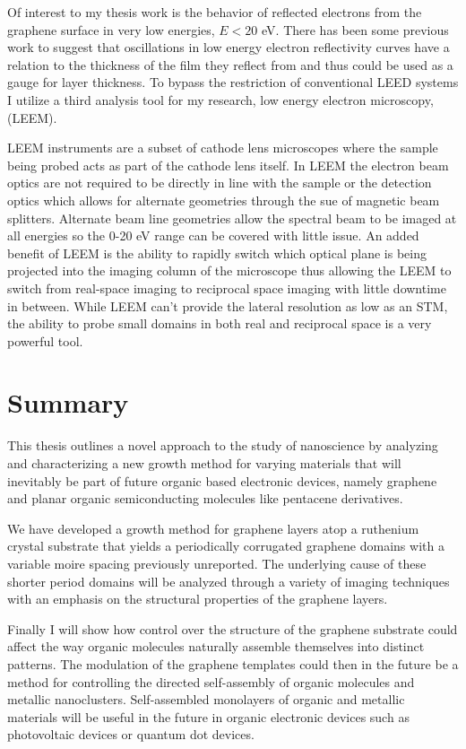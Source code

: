 Of interest to my thesis work is the behavior of reflected electrons from the graphene surface in very low energies, $E < 20$ eV. There has been some previous work to suggest that oscillations in low energy electron reflectivity curves have a relation to the thickness of the film they reflect from and thus could be used as a gauge for layer thickness. To bypass the restriction of conventional LEED systems I utilize a third analysis tool for my research, low energy electron microscopy, (LEEM).

LEEM instruments are a subset of cathode lens microscopes where the sample being probed acts as part of the cathode lens itself. In LEEM the electron beam optics are not required to be directly in line with the sample or the detection optics which allows for alternate geometries through the sue of magnetic beam splitters. Alternate beam line geometries allow the spectral beam to be imaged at all energies so the 0-20 eV range can be covered with little issue. An added benefit of LEEM is the ability to rapidly switch which optical plane is being projected into the imaging column of the microscope thus allowing the LEEM to switch from real-space imaging to reciprocal space imaging with little downtime in between. While LEEM can't provide the lateral resolution as low as an STM, the ability to probe small domains in both real and reciprocal space is a very powerful tool. 

\section{Summary}
This thesis outlines a novel approach to the study of nanoscience by analyzing and characterizing a new growth method for varying materials that will inevitably be part of future organic based electronic devices, namely graphene and planar organic semiconducting molecules like pentacene derivatives.


We have developed a growth method for graphene layers atop a ruthenium crystal substrate that yields a periodically corrugated graphene domains with a variable moire spacing previously unreported. The underlying cause of these shorter period domains will be analyzed through a variety of imaging techniques with an emphasis on the structural properties of the graphene layers.

Finally I will show how control over the structure of the graphene substrate could affect the way organic molecules naturally assemble themselves into distinct patterns. The modulation of the graphene templates could then in the future be a method for controlling the directed self-assembly of organic molecules and metallic nanoclusters. Self-assembled monolayers of organic and metallic materials will be useful in the future in organic electronic devices such as photovoltaic devices or quantum dot devices. 

